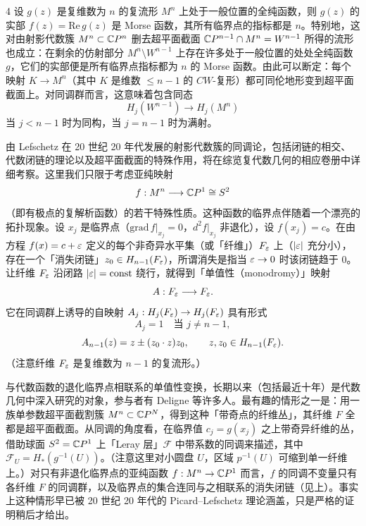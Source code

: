 \begin{example}{4}
设 $g(z)$ 是复维数为 $n$ 的复流形 $M^n$ 上处于一般位置的全纯函数，则 $g(z)$ 的实部 $f(z)=\mathrm{Re}\,g(z)$ 是 Morse 函数，其所有临界点的指标都是 $n$。特别地，这对由射影代数簇 $M^n\subset\mathbb{C}P^n$ 删去超平面截面 $\mathbb{C}P^{n-1}\cap M^n=W^{n-1}$ 所得的流形也成立：在剩余的仿射部分 $M^n\setminus W^{n-1}$ 上存在许多处于一般位置的处处全纯函数 $g$，它们的实部便是所有临界点指标都为 $n$ 的 Morse 函数。由此可以断定：每个映射 $K\to M^n$（其中 $K$ 是维数 $\le n-1$ 的 $CW$-复形）都可同伦地形变到超平面截面上。对同调群而言，这意味着包含同态
\[
  H_j(W^{n-1})\longrightarrow H_j(M^n)
\]
当 $j<n-1$ 时为同构，当 $j=n-1$ 时为满射。

由 Lefschetz 在 20 世纪 20 年代发展的射影代数簇的同调论，包括闭链的相交、代数闭链的理论以及超平面截面的特殊作用，将在综览复代数几何的相应卷册中详细考察。这里我们只限于考虑亚纯映射
\[
  f:M^n\longrightarrow\mathbb{C}P^1\cong S^2
\]
（即有极点的复解析函数）的若干特殊性质。这种函数的临界点伴随着一个漂亮的拓扑现象。设 $x_j$ 是临界点（$\mathrm{grad}\,f|_{x_j}=0$，$d^2f|_{x_j}$ 非退化），设 $f(x_j)=c$。在由方程 $f(x)=c+\varepsilon$ 定义的每个非奇异水平集（或「纤维」）$F_\varepsilon$ 上（$|\varepsilon|$ 充分小），存在一个「消失闭链」$z_0\in H_{n-1}(F_\varepsilon)$，所谓消失是指当 $\varepsilon\to0$ 时该闭链趋于 0。让纤维 $F_\varepsilon$ 沿闭路 $|\varepsilon|=\mathrm{const}$ 绕行，就得到「单值性（monodromy）」映射
\[
  A:F_\varepsilon\longrightarrow F_\varepsilon.
\]
它在同调群上诱导的自映射 $A_j:H_j(F_\varepsilon)\to H_j(F_\varepsilon)$ 具有形式
\[
  A_j=1\quad\text{当 } j\ne n-1,
\]
\[
  A_{n-1}(z)=z\pm(z_0\cdot z)z_0,\qquad z,z_0\in H_{n-1}(F_\varepsilon).
\]
（注意纤维 $F_\varepsilon$ 是复维数为 $n-1$ 的复流形。）

与代数函数的退化临界点相联系的单值性变换，长期以来（包括最近十年）是代数几何中深入研究的对象，参与者有 Deligne 等许多人。最有趣的情形之一是：用一族单参数超平面截割簇 $M^n\subset\mathbb{C}P^N$，得到这种「带奇点的纤维丛」，其纤维 $F$ 全都是超平面截面。从同调的角度看，在临界值 $c_j=g(x_j)$ 之上带奇异纤维的丛，借助球面 $S^2=\mathbb{C}P^1$ 上「Leray 层」$\mathcal F$ 中带系数的同调来描述，其中 $\mathcal F_U=H_*(g^{-1}(U))$。（注意这里对小圆盘 $U$，区域 $p^{-1}(U)$ 可缩到单一纤维上。）对只有非退化临界点的亚纯函数 $f:M^n\to\mathbb{C}P^1$ 而言，$f$ 的同调不变量只有各纤维 $F$ 的同调群，以及临界点的集合连同与之相联系的消失闭链（见上）。事实上这种情形早已被 20 世纪 20 年代的 Picard--Lefschetz 理论涵盖，只是严格的证明稍后才给出。
\end{example}

